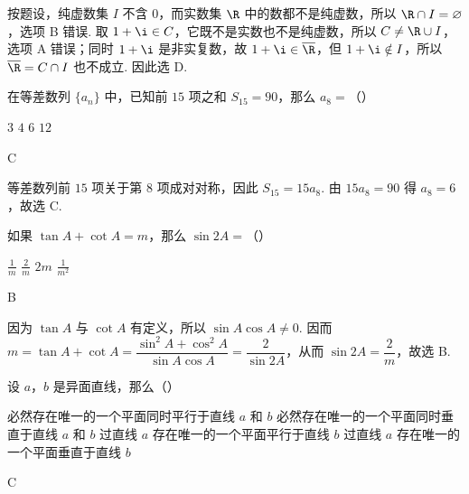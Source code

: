 \documentclass[UTF8,a4paper,oneside,11pt]{ctexbook}
\begin{document}
\begin{solution}
按题设，纯虚数集 \(I\) 不含 \(0\)，而实数集 \(\R\) 中的数都不是纯虚数，所以 \(\R\cap I=\varnothing\)，选项 B 错误. 取 \(1+\i\in C\)，它既不是实数也不是纯虚数，所以 \(C\ne\R\cup I\)，选项 A 错误；同时 \(1+\i\) 是非实复数，故 \(1+\i\in\overline{\R}\)，但 \(1+\i\notin I\)，所以 \(\overline{\R}=C\cap I\) 也不成立. 因此选 D.
\end{solution}

\begin{problem}
在等差数列 \(\{a_n\}\) 中，已知前 \(15\) 项之和 \(S_{15} = 90\)，那么 \(a_8 =\)（\quad）

\choices
    {\(3\)}
    {\(4\)}
    {\(6\)}
    {\(12\)}
\end{problem}

\begin{answer}
C
\end{answer}

\begin{solution}
等差数列前 \(15\) 项关于第 \(8\) 项成对对称，因此 \(S_{15}=15a_8\). 由 \(15a_8=90\) 得 \(a_8=6\)，故选 C.
\end{solution}

\begin{problem}
如果 \(\tan A + \cot A = m\)，那么 \(\sin 2A =\)（\quad）

\choices
    {\(\frac{1}{m}\)}
    {\(\frac{2}{m}\)}
    {\(2m\)}
    {\(\frac{1}{m^2}\)}
\end{problem}

\begin{answer}
B
\end{answer}

\begin{solution}
因为 \(\tan A\) 与 \(\cot A\) 有定义，所以 \(\sin A\cos A\ne0\). 因而
\(m=\tan A+\cot A=\dfrac{\sin^2A+\cos^2A}{\sin A\cos A}=\dfrac{2}{\sin2A}\)，从而 \(\sin2A=\dfrac{2}{m}\)，故选 B.
\end{solution}

\begin{problem}
设 \(a\)，\(b\) 是异面直线，那么（\quad）

\choices
    {必然存在唯一的一个平面同时平行于直线 \(a\) 和 \(b\)}
    {必然存在唯一的一个平面同时垂直于直线 \(a\) 和 \(b\)}
    {过直线 \(a\) 存在唯一的一个平面平行于直线 \(b\)}
    {过直线 \(a\) 存在唯一的一个平面垂直于直线 \(b\)}
\end{problem}

\begin{answer}
C
\end{answer}
\end{document}
